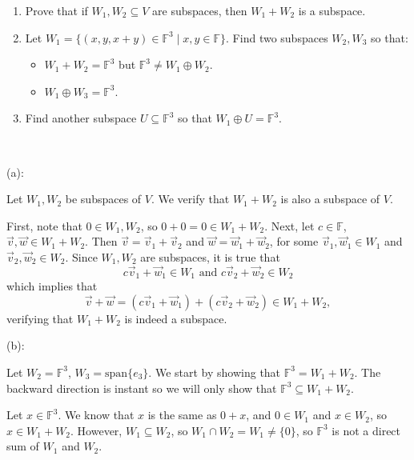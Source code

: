 \documentclass{article}
\theoremstyle{plain} %
\numberwithin{thm}{section} %
\theoremstyle{definition}
\begin{document}
    \begin{question}{8}
        \begin{enumerate}[label=(\alph*)]
            \item Prove that if \( W_1, W_2 \subseteq V \) are subspaces, then \( W_1 + W_2 \) is a subspace.
            \item Let \( W_1 = \{(x, y, x + y) \in \mathbb{F}^3 \mid x, y \in \mathbb{F} \} \). Find two subspaces \( W_2, W_3 \) so that:
            
            \begin{itemize}
                \item \( W_1 + W_2 = \mathbb{F}^3 \) but \( \mathbb{F}^3 \neq W_1 \oplus W_2 \).
                \item \( W_1 \oplus W_3 = \mathbb{F}^3 \).
            \end{itemize}
            
            \item Find another subspace \( U \subseteq \mathbb{F}^3 \) so that \( W_1 \oplus U = \mathbb{F}^3 \).
        \end{enumerate}

        \tcblower
        \ 

        (a):

        Let \(W_1, W_2\) be subspaces of \(V\). We verify that \(W_1 + W_2\) is also a subspace of \(V\).

        First, note that \(0 \in W_1, W_2\), so \(0 + 0 = 0 \in W_1 + W_2\). Next, let \(c \in \mathbb{F}\), \(\vec{v} , \vec{w} \in W_1 + W_2\). Then \(\vec{v} = \vec{v}_1 + \vec{v}_2\) and \(\vec{w} = \vec{w}_1 + \vec{w}_2\), for some \(\vec{v}_1, \vec{w}_1 \in W_1\) and \(\vec{v}_2, \vec{w}_2 \in W_2\). Since \(W_1, W_2\) are subspaces, it is true that
        \[
            c\vec{v}_1 + \vec{w}_1 \in W_1 \text{ and } c\vec{v}_2 + \vec{w}_2 \in W_2
        \]
        which implies that
        \[
            \vec{v} + \vec{w} = (c\vec{v}_1 + \vec{w}_1) + (c\vec{v}_2 + \vec{w}_2) \in W_1 + W_2,
        \]
        verifying that \(W_1 + W_2\) is indeed a subspace.

        \medskip

        (b):

        Let \(W_2 = \mathbb{F}^3\), \(W_3 = \mathrm{span} \{e_3\}\). We start by showing that \(\mathbb{F}^3 = W_1 + W_2\). The backward direction is instant so we will only show that \(\mathbb{F}^3 \subseteq W_1 + W_2\).

        Let \(x \in \mathbb{F}^3\). We know that \(x\) is the same as \(0 + x\), and \(0 \in W_1\) and \(x \in W_2\), so \(x \in W_1 + W_2\). However, \(W_1 \subseteq W_2\), so \(W_1 \cap W_2 = W_1 \neq \{ 0 \}\), so \(\mathbb{F}^3\) is not a direct sum of \(W_1\) and \(W_2\).


\end{question}
\end{document}

